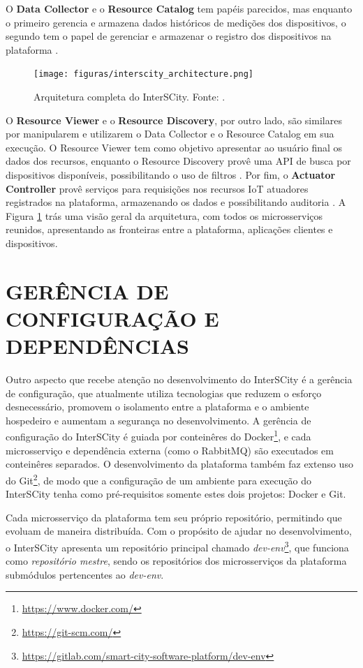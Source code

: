 O \textbf{Data Collector} e o \textbf{Resource Catalog} tem papéis parecidos,
mas enquanto o primeiro gerencia e armazena dados históricos de medições dos
dispositivos, o segundo tem o papel de gerenciar e armazenar o registro dos
dispositivos na plataforma \cite{delesposte2017}.

\begin{figure}
  \centering
    \texttt{[image: figuras/interscity\_architecture.png]}
    \caption{Arquitetura completa do InterSCity. Fonte: .}
  \label{fig:interscity-architecture}
\end{figure}


O \textbf{Resource Viewer} e o \textbf{Resource Discovery}, por outro lado,
são similares por manipularem e utilizarem o Data Collector e o Resource
Catalog em sua execução. O Resource Viewer tem como objetivo apresentar ao
usuário final os dados dos recursos, enquanto o Resource Discovery provê uma API
 de busca por dispositivos disponíveis, possibilitando o uso de filtros
\cite{delesposte2017}. Por fim, o \textbf{Actuator Controller} provê serviços
para requisições nos recursos IoT atuadores registrados na plataforma,
armazenando os dados e possibilitando auditoria \cite{delesposte2017}. A Figura
\ref{fig:interscity-architecture} trás uma visão geral da arquitetura, com todos
os microsserviços reunidos, apresentando as fronteiras entre a plataforma,
aplicações clientes e dispositivos.

\section{GERÊNCIA DE CONFIGURAÇÃO E DEPENDÊNCIAS}

Outro aspecto que recebe atenção no desenvolvimento do InterSCity é a gerência
de configuração, que atualmente utiliza tecnologias que reduzem o esforço
desnecessário, promovem o isolamento entre a plataforma e o ambiente hospedeiro
e aumentam a segurança no desenvolvimento. A gerência de configuração do
InterSCity é guiada por conteinêres do
Docker\footnote{\url{https://www.docker.com/}}, e cada microsserviço e
dependência externa (como o RabbitMQ) são executados em
conteinêres separados. O desenvolvimento da plataforma também faz extenso
uso do Git\footnote{\url{https://git-scm.com/}}, de modo que a
configuração de um ambiente para execução do InterSCity tenha como
pré-requisitos somente estes dois projetos: Docker e Git.

Cada microsserviço da plataforma tem seu próprio repositório, permitindo que
evoluam de maneira distribuída. Com o propósito de ajudar no desenvolvimento,
o InterSCity apresenta um repositório principal chamado
\textit{dev-env}\footnote{\url{https://gitlab.com/smart-city-software-platform/dev-env}},
que funciona como \textit{repositório mestre}, sendo os repositórios dos
microsserviços da plataforma submódulos pertencentes ao \textit{dev-env}.

